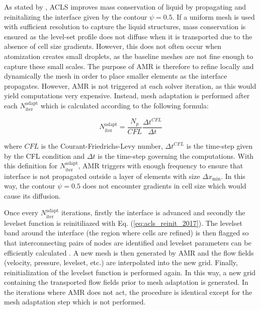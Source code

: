 As stated by , ACLS improves mass conservation of liquid by propagating and reinitalizing the interface given by the contour $\psi = 0.5$. If a uniform mesh is used with sufficient resolution to capture the liquid structures, mass conservation is ensured as the level-set profile does not diffuse when it is transported due to the absence of cell size gradients. However, this does not often occur when atomization creates small droplets, as the baseline meshes are not fine enough to capture these small scales. The purpose of AMR is therefore to refine locally and dynamically the mesh in order to place smaller elements as the interface propagates. However, AMR is not triggered at each solver iteration, as this would yield computations very expensive. Instead, mesh adaptation is performed after each $N_\mathrm{iter}^\mathrm{adapt}$ which is calculated according to the following formula:

\begin{equation}
\label{eq:ch2_N_iter_adapt_AMR}
N_\mathrm{iter}^\mathrm{adapt} = \frac{N_p}{CFL} \frac{\Delta t^{CFL}}{\Delta t}
\end{equation}

where $CFL$ is the Courant-Friedrichs-Levy number, $\Delta t^{CFL}$ is the time-step given by the CFL condition and $\Delta t$ is the time-step governing the computations.  With this definition for $N_\mathrm{iter}^\mathrm{adapt}$, AMR triggers with enough frequency to ensure that interface is not propagated outside a layer of elements with size $\Delta x_\mathrm{min}$. In this way, the contour $\psi = 0.5$ does not encounter gradients in cell size which would cause its diffusion.

Once every $N_\mathrm{iter}^\mathrm{adapt}$ iterations, firstly the interface is advanced and secondly the levelset function is reinitiliazed with Eq. (\ref{eq:acls_reinit_2017}). The levelset band around the interface (the region where cells are refined) is then flagged so that interconnecting pairs of nodes are identified and levelset parameters can be efficiently calculated . A new mesh is then generated by AMR and the flow fields (velocity, pressure, levelset, etc.) are interpolated into the new grid. Finally, reinitialization of the levelset function is performed again. In this way, a new grid containing the transported flow fields prior to mesh adaptation is generated. In the iterations where AMR does not act, the procedure is identical except for the mesh adaptation step which is not performed. %


